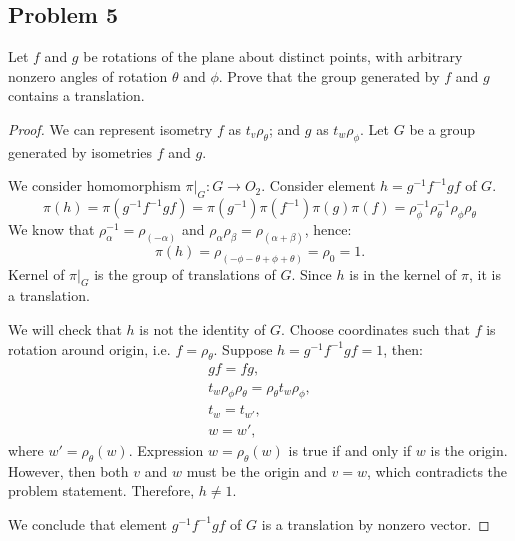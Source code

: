 \documentclass{article}
\theoremstyle{definition}
\newcommand{\restrict}[1]{ \big|_{#1} }
\begin{document}
\subsection*{Problem 5}

\begin{tcolorbox}
Let $f$ and $g$ be rotations of the plane about distinct points, with arbitrary nonzero angles of rotation $\theta$ and $\phi$.
Prove that the group generated by $f$ and $g$ contains a translation.
\end{tcolorbox}

\begin{proof}

We can represent isometry $f$ as $t_v \rho_\theta$; and $g$ as $t_w \rho_\phi$.
Let $G$ be a group generated by isometries $f$ and $g$.

We consider homomorphism $\pi \restrict{G} : G \to O_2$.
Consider element $h = g^{-1} f^{-1} g f$ of $G$.
\[
    \pi (h)
    = \pi (g^{-1} f^{-1} g f) 
    = \pi (g^{-1}) \pi (f^{-1}) \pi (g) \pi(f)
    = \rho_\phi^{-1} \rho_\theta^{-1} \rho_\phi \rho_\theta
\]
We know that $\rho_{\alpha}^{-1} = \rho_{(-\alpha)}$ and $\rho_\alpha \rho_\beta = \rho_{(\alpha + \beta)}$, hence:
\[ 
    \pi (h)
    = \rho_{(-\phi-\theta+\phi+\theta)} = \rho_0 = 1.
\]
Kernel of $\pi \restrict{G}$ is the group of translations of $G$.
Since $h$ is in the kernel of $\pi$, it is a translation.

We will check that $h$ is not the identity of $G$.
Choose coordinates such that $f$ is rotation around origin, i.e. $f = \rho_\theta$.
Suppose $h = g^{-1} f^{-1} g f = 1$, then:
\begin{gather*}
    gf = fg, \\
    t_w \rho_\phi \rho_\theta = \rho_\theta t_w \rho_\phi, \\
    t_w = t_{w'}, \\
    w = w',
\end{gather*}
where $w' = \rho_\theta(w)$.
Expression $w = \rho_\theta(w)$ is true if and only if $w$ is the origin.
However, then both $v$ and $w$ must be the origin and $v=w$, which contradicts the problem statement.
Therefore, $h \neq 1$.

We conclude that element $g^{-1} f^{-1} g f$ of $G$ is a translation by nonzero vector.

\end{proof}
\end{document}
